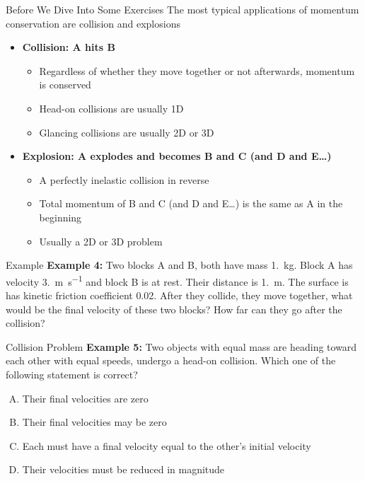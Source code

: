 \documentclass[12pt,compress,aspectratio=169]{beamer}
\begin{document}
\begin{frame}{Before We Dive Into Some Exercises}
  The most typical applications of momentum conservation are collision and
  explosions
  \begin{itemize}
  \item\textbf{Collision: A hits B}
    \begin{itemize}
    \item Regardless of whether they move together or not afterwards, momentum
      is conserved
    \item Head-on collisions are usually 1D
    \item Glancing collisions are usually 2D or 3D
    \end{itemize}
  \item\textbf{Explosion: A explodes and becomes B and C (and D and E\ldots)}
    \begin{itemize}
    \item A perfectly inelastic collision in reverse
    \item Total momentum of B and C (and D and E\ldots) is the same as A in the
      beginning
    \item Usually a 2D or 3D problem
    \end{itemize}
  \end{itemize}
\end{frame}



\begin{frame}{Example}
  \textbf{Example 4:} Two blocks A and B, both have mass \SI{1.}{\kilo\gram}.
  Block A has velocity \SI{3.}{\metre\per\second} and block B is at rest. Their
  distance is \SI{1.}{\metre}. The surface is has kinetic friction coefficient
  0.02. After they collide, they move together, what would be the final
  velocity of these two blocks? How far can they go after the collision?
\end{frame}



\begin{frame}{Collision Problem}
  \textbf{Example 5:} Two objects with equal mass are heading toward each
  other with equal speeds, undergo a head-on collision. Which one of the
  following statement is correct?

  \vspace{.15in}\begin{enumerate}[A.]
  \item Their final velocities are zero
  \item Their final velocities may be zero
  \item Each must have a final velocity equal to the other's initial velocity
  \item Their velocities must be reduced in magnitude
  \end{enumerate}
\end{frame}
\end{document}

